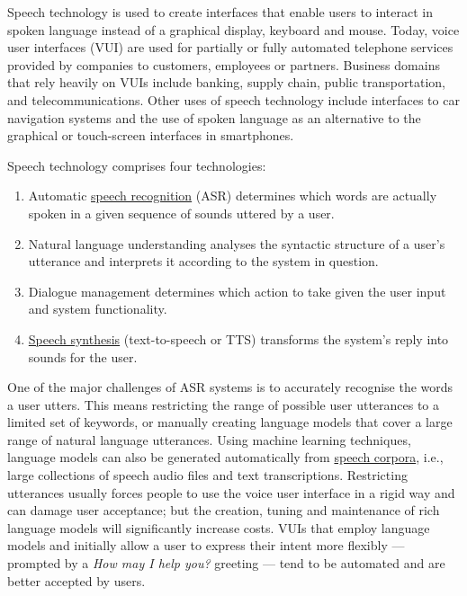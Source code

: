 \documentclass[]{../../metanetpaper}
\begin{document}
\begin{multicols}{2}

Speech technology is used to create interfaces that enable users to
interact in spoken language instead of a graphical display, keyboard and mouse.
Today, voice user interfaces (VUI) are used for partially or
fully automated telephone services provided by companies to customers,
employees or partners. Business domains that rely heavily on VUIs include
banking, supply chain, public transportation, and telecommunications. Other
uses of speech technology include interfaces to car navigation systems and the
use of spoken language as an alternative to the graphical or touch-screen
interfaces in smartphones.

Speech technology comprises four technologies:
\begin{enumerate}
\item Automatic \underline{speech recognition} (ASR) determines which words are actually
    spoken in a given sequence of sounds uttered by a user.

\item Natural language understanding analyses the syntactic structure of a user’s
    utterance and interprets it according to the system in question.

\item Dialogue management determines which action to take given the user input
    and system functionality.

\item \underline{Speech synthesis} (text-to-speech or TTS) transforms the system’s reply into
    sounds for the user.
\end{enumerate}

One of the major challenges of ASR systems is to accurately recognise the words
a user utters. This means restricting the range of possible user utterances to
a limited set of keywords, or manually creating language models that cover a
large range of natural language utterances. Using machine learning techniques,
language models can also be generated automatically from \underline{speech corpora}, i.e.,
large collections of speech audio files and text transcriptions. Restricting
utterances usually forces people to use the voice user interface in a rigid way
and can damage user acceptance; but the creation, tuning and maintenance of
rich language models will significantly increase costs. VUIs that employ
language models and initially allow a user to express their intent more
flexibly — prompted by a \textit{How may I help you?} greeting — tend to be automated
and are better accepted by users.


\end{multicols}
\end{document}
